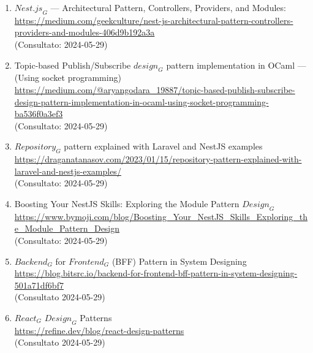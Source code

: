 \begin{enumerate}
\item $\textit{Nest.js}_G$ — Architectural Pattern, Controllers, Providers, and Modules: \\
  \href{https://medium.com/geekculture/nest-js-architectural-pattern-controllers-providers-and-modules-406d9b192a3a}{https://medium.com/geekculture/nest-js-architectural-pattern-controllers-providers-and-modules-406d9b192a3a} \\
  (Consultato: 2024-05-29)

\item Topic-based Publish/Subscribe $\textit{design}_G$ pattern implementation in OCaml — (Using socket programming) \\
\href{https://medium.com/@aryangodara\_19887/topic-based-publish-subscribe-design-pattern-implementation-in-ocaml-using-socket-programming-ba536f0a3ef3}{https://medium.com/@aryangodara\_19887/topic-based-publish-subscribe-design-pattern-implementation-in-ocaml-using-socket-programming-ba536f0a3ef3} \\
(Consultato: 2024-05-29)

\item $\textit{Repository}_G$ pattern explained with Laravel and NestJS examples \\
\href{https://draganatanasov.com/2023/01/15/repository-pattern-explained-with-laravel-and-nestjs-examples/}{https://draganatanasov.com/2023/01/15/repository-pattern-explained-with-laravel-and-nestjs-examples/} \\
(Consultato: 2024-05-29)

\item Boosting Your NestJS Skills: Exploring the Module Pattern $\textit{Design}_G$ \\
\url{https://www.bymoji.com/blog/Boosting\_Your\_NestJS\_Skills\_Exploring\_the\_Module\_Pattern\_Design} \\
(Consultato: 2024-05-29)

\item $\textit{Backend}_G$ for $\textit{Frontend}_G$ (BFF) Pattern in System Designing \\
\href{https://blog.bitsrc.io/backend-for-frontend-bff-pattern-in-system-designing-501a71df6bf7}{https://blog.bitsrc.io/backend-for-frontend-bff-pattern-in-system-designing-501a71df6bf7} \\
(Consultato 2024-05-29)

\item $\textit{React}_G$ $\textit{Design}_G$ Patterns \\
\href{https://refine.dev/blog/react-design-patterns}{https://refine.dev/blog/react-design-patterns} \\
(Consultato 2024-05-29)


\end{enumerate}